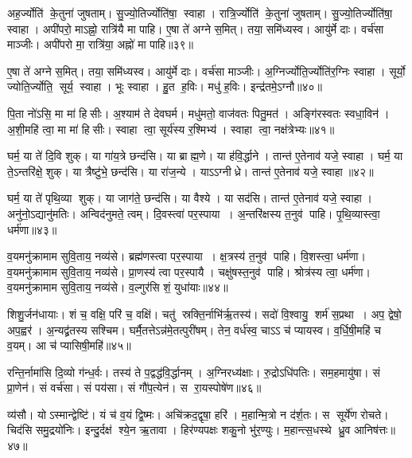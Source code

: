 अह॒र्ज्योति॑ के॒तुना॑ जुषताम्। सु॒ज्यो॒तिर्ज्योति॑षा॒ स्वाहा। रात्रि॒र्ज्योति॑ के॒तुना॑ जुषताम्। सु॒ज्यो॒तिर्ज्योति॑षा॒ स्वाहा। अपी॑परो॒ माऽह्नो॒ रात्रि॑यै मा पाहि। ए॒षा ते॑ अग्ने स॒मित्। तया॒ समि॑ध्यस्व। आयु॑र्मे दाः। वर्च॑सा माञ्जीः। अपी॑परो मा॒ रात्रि॑या॒ अह्नो॑ मा पाहि॥३९॥

ए॒षा ते॑ अग्ने स॒मित्। तया॒ समि॑ध्यस्व। आयु॑र्मे दाः। वर्च॑सा माञ्जीः। अ॒ग्निर्ज्योति॒र्ज्योति॑र॒ग्निः स्वाहा। सूर्यो॒ ज्योति॒र्ज्योति॒ सूर्य॒ स्वाहा। भूः स्वाहा। हु॒त ह॒विः। मधु॑ ह॒विः। इन्द्र॑तमे॒ऽग्नौ॥४०॥

पि॒ता नो॑ऽसि॒ मा मा॑ हिसीः। अ॒श्याम॑ ते देवघर्म। मधु॑मतो॒ वाज॑वतः पितु॒मत॑। अङ्गि॑रस्वतः स्वधा॒विन॑। अ॒शी॒महि॑ त्वा॒ मा मा॑ हिसीः। स्वाहा त्वा॒ सूर्य॑स्य र॒श्मिभ्य॑। स्वाहा त्वा॒ नक्ष॑त्रेभ्यः॥४१॥
\anuvakamend[ब्र॒ह्म॒व॒र्च॒साय॑ पीपिहि स्क॒न्दयाद्रु॒द्राय॑ रु॒द्रहोत्रे॒ स्वाहाऽह्नो॑ मा पाह्य॒ग्नौ स॒प्त च॑]

घर्म॒ या ते॑ दि॒वि शुक्। या गा॑य॒त्रे छन्द॑सि। या ब्राह्म॒णे। या ह॑वि॒र्द्धाने। तान्त॑ ए॒तेनाव॑ यजे॒ स्वाहा। घर्म॒ या ते॒ऽन्तरि॑क्षे॒ शुक्। या त्रैष्टु॑भे॒ छन्द॑सि। या रा॑ज॒न्ये। याऽऽग्नीध्रे। तान्त॑ ए॒तेनाव॑ यजे॒ स्वाहा॥४२॥

घर्म॒ या ते॑ पृथि॒व्या शुक्। या जाग॑ते॒ छन्द॑सि। या वैश्ये। या सद॑सि। तान्त॑ ए॒तेनाव॑ यजे॒ स्वाहा। अनु॑नो॒ऽद्यानु॑मतिः। अन्विद॑नुमते॒ त्वम्। दि॒वस्त्वा॑ पर॒स्पाया। अ॒न्तरि॑क्षस्य त॒नुव॑ पाहि। पृ॒थि॒व्यास्त्वा॒ धर्म॑णा॥४३॥

व॒यमनु॑क्रामाम सुवि॒ताय॒ नव्य॑से। ब्रह्म॑णस्त्वा पर॒स्पाया। क्ष॒त्रस्य॑ त॒नुव॑ पाहि। वि॒शस्त्वा॒ धर्म॑णा। व॒यमनु॑क्रामाम सुवि॒ताय॒ नव्य॑से। प्रा॒णस्य॑ त्वा पर॒स्पायै। चक्षु॑षस्त॒नुव॑ पाहि। श्रोत्र॑स्य त्वा॒ धर्म॑णा। व॒यमनु॑क्रामाम सुवि॒ताय॒ नव्य॑से। व॒ल्गुर॑सि शं॒ युधा॑याः॥४४॥

शिशु॒र्जन॑धायाः। शं च॒ वक्षि॒ परि॑ च॒ वक्षि॑। चतु॑ स्रक्ति॒र्नाभि॑र्\mbox{}ऋ॒तस्य॑। सदो॑ वि॒श्वायु॒ शर्म॑ स॒प्रथा। अप॒ द्वेषो॒ अप॒ह्वर॑। अ॒न्यद्व्र॑तस्य सश्चिम। घर्मै॒तत्तेऽन्न॑मे॒तत्पुरी॑षम्। तेन॒ वर्ध॑स्व॒ चाऽऽ च॑ प्यायस्व। व॒र्धि॒षी॒महि॑ च व॒यम्। आ च॑ प्यासिषी॒महि॑॥४५॥

रन्ति॒र्नामा॑सि दि॒व्यो ग॑न्ध॒र्वः। तस्य॑ ते प॒द्वद्ध॑वि॒र्द्धानम्। अ॒ग्निरध्य॑क्षाः। रु॒द्रोऽधि॑पतिः। सम॒हमायु॑षा। सं प्रा॒णेन॑। सं वर्च॑सा। सं पय॑सा। सं गौ॑प॒त्येन॑। स रा॒यस्पोषे॑ण॥४६॥

व्य॑सौ। योऽस्मान्द्वेष्टि॑। यं च॑ व॒यं द्वि॒ष्मः। अचि॑क्रद॒द्वृषा॒ हरि॑। म॒हान्मि॒त्रो न द॑र्\mbox{}श॒तः। स सूर्ये॑ण रोचते। चिद॑सि समु॒द्रयो॑निः। इन्दु॒र्दक्ष॑ श्ये॒न ऋ॒तावा। हिर॑ण्यपक्षः  शकु॒नो भु॑र॒ण्युः। म॒हान्त्स॒धस्थे ध्रु॒व आनिष॑त्तः॥४७॥

